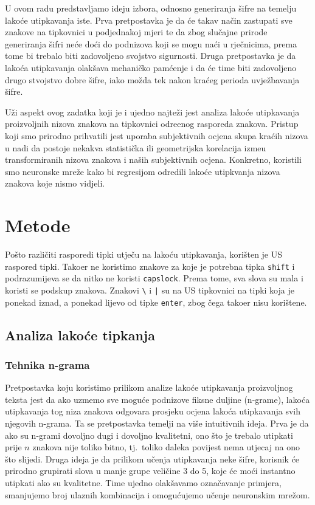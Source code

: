 \documentclass[a4paper,twocolumn]{article}
\begin{document}
U ovom radu predstavljamo ideju izbora, odnosno generiranja \v{s}ifre na
temelju lako\'ce utipkavanja iste. Prva pretpostavka je da \'ce takav na\v{c}in
zastupati sve znakove na tipkovnici u podjednakoj mjeri te da zbog slu\v{c}ajne
prirode generiranja \v{s}ifri ne\'ce do\'ci do podnizova koji se mogu na\'ci u
rje\v{c}nicima, prema tome bi trebalo biti zadovoljeno svojstvo sigurnosti.
Druga pretpostavka je da lako\'ca utipkavanja olak\v{s}ava mehani\v{c}ko
pam\'cenje i da \'ce time biti zadovoljeno drugo stvojstvo dobre \v{s}ifre,
iako mo\v{z}da tek nakon kra\'ceg perioda uvje\v{z}bavanja \v{s}ifre.

U\v{z}i aspekt ovog zadatka koji je i ujedno najte\v{z}i jest analiza lako\'ce
utipkavanja proizvoljnih nizova znakova na tipkovnici odre\dj enog rasporeda
znakova. Pristup koji smo prirodno prihvatili jest uporaba subjektivnih ocjena
skupa kra\'cih nizova u nadi da postoje nekakva statisti\v{c}ka ili geometrijska
korelacija izme\dj u transformiranih nizova znakova i na\v{s}ih subjektivnih ocjena.
Konkretno, koristili smo neuronske mre\v{z}e kako bi regresijom odredili lako\'ce
utipkvanja nizova znakova koje nismo vidjeli.

\section{Metode}

Po\v{s}to razli\v{c}iti rasporedi tipki utje\v{c}u na lako\'cu utipkavanja,
kori\v{s}ten je US raspored tipki. Tako\dj er ne koristimo znakove za koje je
potrebna tipka \texttt{shift} i podrazumijeva se da nitko ne koristi
\texttt{capslock}. Prema tome, sva slova su mala i koristi se podskup znakova.
Znakovi \texttt{\textbackslash} i \texttt{|} su na US tipkovnici na tipki koja
je ponekad iznad, a ponekad lijevo od tipke \texttt{enter}, zbog \v{c}ega
tako\dj er nisu kori\v{s}tene.

\subsection{Analiza lako\'ce tipkanja}

\subsubsection{Tehnika n-grama}

Pretpostavka koju koristimo prilikom analize lako\'ce utipkavanja proizvoljnog
teksta jest da ako uzmemo sve mogu\'ce podnizove fiksne duljine (n-grame),
lako\'ca utipkavanja tog niza znakova odgovara prosjeku ocjena lako\'ca
utipkavanja svih njegovih n-grama. Ta se pretpostavka temelji na vi\v{s}e
intuitivnih ideja. Prva je da ako su n-grami dovoljno dugi i dovoljno
kvalitetni, ono \v{s}to je trebalo utipkati prije $n$ znakova nije toliko
bitno, tj.\ toliko daleka povijest nema utjecaj na ono \v{s}to slijedi. Druga
ideja je da prilikom u\v{c}enja utipkavanja neke \v{s}ifre, korisnik \'ce
prirodno grupirati slova u manje grupe veli\v{c}ine 3 do 5, koje \'ce mo\'ci
instantno utipkati ako su kvalitetne. Time ujedno olak\v{s}avamo
ozna\v{c}avanje primjera, smanjujemo broj ulaznih kombinacija i omogu\'cujemo
u\v{c}enje neuronskim mre\v{z}om.
\end{document}
